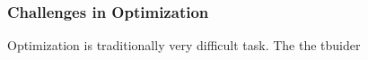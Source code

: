 \subsubsection{Challenges in Optimization}

Optimization is traditionally very difficult task. The the tbuider